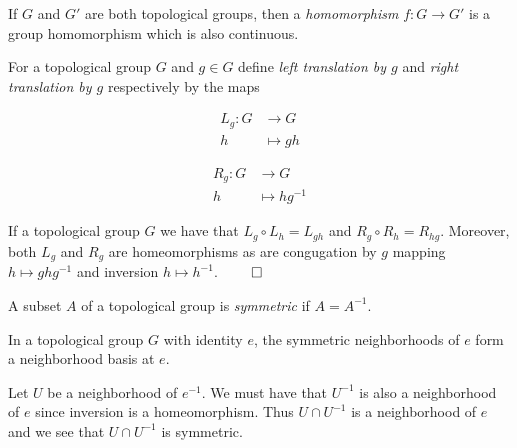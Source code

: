 \documentclass[letterpaper, 11pt, oneside]{book}
\begin{document}
\begin{defn}[Homomorphism]
  If $G$ and $G'$ are both topological groups, then a \emph{homomorphism} $f\colon G \to G'$ is a group homomorphism which is also continuous.
\end{defn}

\begin{defn}[Translation]
  For a topological group $G$ and $g \in G$ define \emph{left translation by $g$} and \emph{right translation by $g$} respectively by the maps

  \noindent\begin{minipage}{.5\linewidth}
    \begin{align*}
      L_{g}\colon G &\to G \\
      h &\mapsto gh
    \end{align*}
  \end{minipage}%
  \begin{minipage}{.5\linewidth}
    \begin{align*}
      R_{g}\colon G &\to G \\
      h &\mapsto hg^{-1}
    \end{align*}
  \end{minipage}
\end{defn}

\begin{prop}
  If a topological group $G$ we have that $L_{g} \circ L_{h} = L_{gh}$ and $R_{g} \circ R_{h} = R_{hg}$.
  Moreover, both $L_{g}$ and $R_{g}$ are homeomorphisms as are congugation by $g$ mapping $h \mapsto ghg^{-1}$ and inversion $h \mapsto h^{-1}$.
  $\hfill\qed$
\end{prop}

\begin{defn}[Symmetric]
  A subset $A$ of a topological group is \emph{symmetric} if $A = A^{-1}$.
\end{defn}

\begin{prop}
  In a topological group $G$ with identity $e$, the symmetric neighborhoods of $e$ form a neighborhood basis at $e$.
\end{prop}
\begin{pf}
  Let $U$ be a neighborhood of $e^{-1}$.
  We must have that $U^{-1}$ is also a neighborhood of $e$ since inversion is a homeomorphism.
  Thus $U \cap U^{-1}$ is a neighborhood of $e$ and we see that $U \cap U^{-1}$ is symmetric.
\end{pf}

\clearpage
\end{document}
